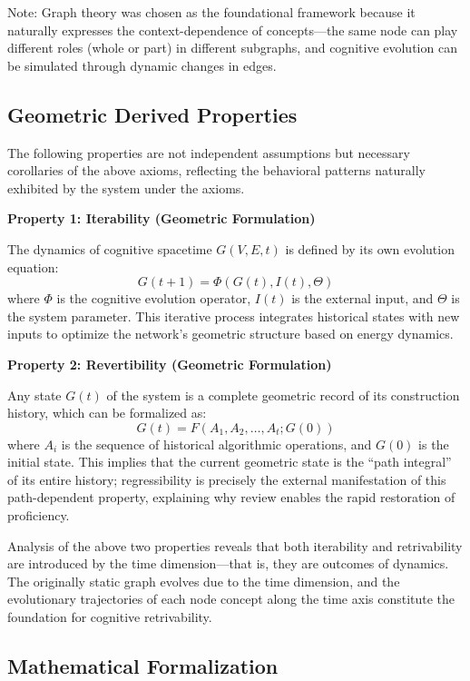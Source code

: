 \documentclass[10pt,onecolumn]{article}
\begin{document}
Note: Graph theory was chosen as the foundational framework because it naturally expresses the context-dependence of concepts—the same node can play different roles (whole or part) in different subgraphs, and cognitive evolution can be simulated through dynamic changes in edges.

\subsection{Geometric Derived Properties}

The following properties are not independent assumptions but necessary corollaries of the above axioms, reflecting the behavioral patterns naturally exhibited by the system under the axioms.

\textbf{Property 1: Iterability (Geometric Formulation)}

The dynamics of cognitive spacetime $G(V,E,t)$ is defined by its own evolution equation:
\begin{equation}
G(t+1) = \Phi(G(t), I(t), \Theta)
\end{equation}
where $\Phi$ is the cognitive evolution operator, $I(t)$ is the external input, and $\Theta$ is the system parameter. This iterative process integrates historical states with new inputs to optimize the network’s geometric structure based on energy dynamics.

\textbf{Property 2: Revertibility (Geometric Formulation)}

Any state $G(t)$ of the system is a complete geometric record of its construction history, which can be formalized as:
\begin{equation}
G(t) = F(A_1, A_2, \ldots, A_t; G(0))
\end{equation}
where $A_i$ is the sequence of historical algorithmic operations, and $G(0)$ is the initial state. This implies that the current geometric state is the “path integral” of its entire history; regressibility is precisely the external manifestation of this path-dependent property, explaining why review enables the rapid restoration of proficiency.

Analysis of the above two properties reveals that both iterability and retrivability are introduced by the time dimension—that is, they are outcomes of dynamics. The originally static graph evolves due to the time dimension, and the evolutionary trajectories of each node concept along the time axis constitute the foundation for cognitive retrivability.

\subsection{Mathematical Formalization}
\end{document}
